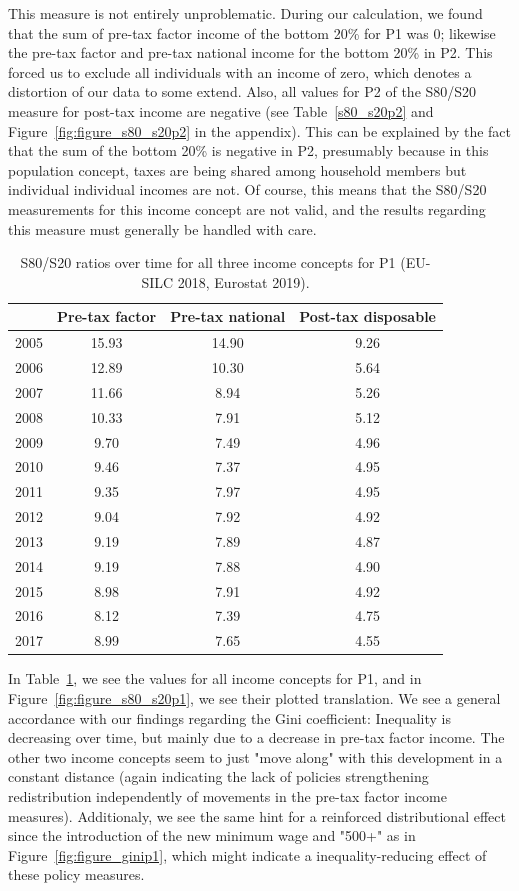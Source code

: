 \documentclass[a4paper]{article}\usepackage[]{graphicx}\usepackage[]{color}
\begin{document}
This measure is not entirely unproblematic. During our calculation, we found that the sum of pre-tax factor income of the bottom 20\% for P1 was 0; likewise the pre-tax factor and pre-tax national income for the bottom 20\% in P2. This forced us to exclude all individuals with an income of zero, which denotes a distortion of our data to some extend. Also, all values for P2 of the S80/S20 measure for post-tax income are negative (see Table~\ref{s80_s20p2} and Figure~\ref{fig:figure_s80_s20p2} in the appendix). This can be explained by the fact that the sum of the bottom 20\% is negative in P2, presumably because in this population concept, taxes are being shared among household members but individual individual incomes are not. Of course, this means that the S80/S20 measurements for this income concept are not valid, and the results regarding this measure must generally be handled with care.
\begin{table}[ht]
\centering
\begin{tabular}{lccc}
  \toprule
 & Pre-tax factor & Pre-tax national & Post-tax disposable \\ 
  \midrule
2005 & 15.93 & 14.90 & 9.26 \\ 
  2006 & 12.89 & 10.30 & 5.64 \\ 
  2007 & 11.66 & 8.94 & 5.26 \\ 
  2008 & 10.33 & 7.91 & 5.12 \\ 
  2009 & 9.70 & 7.49 & 4.96 \\ 
  2010 & 9.46 & 7.37 & 4.95 \\ 
  2011 & 9.35 & 7.97 & 4.95 \\ 
  2012 & 9.04 & 7.92 & 4.92 \\ 
  2013 & 9.19 & 7.89 & 4.87 \\ 
  2014 & 9.19 & 7.88 & 4.90 \\ 
  2015 & 8.98 & 7.91 & 4.92 \\ 
  2016 & 8.12 & 7.39 & 4.75 \\ 
  2017 & 8.99 & 7.65 & 4.55 \\ 
   \bottomrule
\end{tabular}
\caption{S80/S20 ratios over time for all three income concepts for P1 (EU-SILC 2018, Eurostat 2019).} 
\label{s80_s20p1}
\end{table}

In Table~\ref{s80_s20p1}, we see the values for all income concepts for P1, and in Figure~\ref{fig:figure_s80_s20p1}, we see their plotted translation. We see a general accordance with our findings regarding the Gini coefficient: Inequality is decreasing over time, but mainly due to a decrease in pre-tax factor income. The other two income concepts seem to just "move along" with this development in a constant distance (again indicating the lack of policies strengthening redistribution independently of movements in the pre-tax factor income measures). Additionaly, we see the same hint for a reinforced distributional effect since the introduction of the new minimum wage and "500+" as in Figure~\ref{fig:figure_ginip1}, which might indicate a inequality-reducing effect of these policy measures. 
\end{document}
